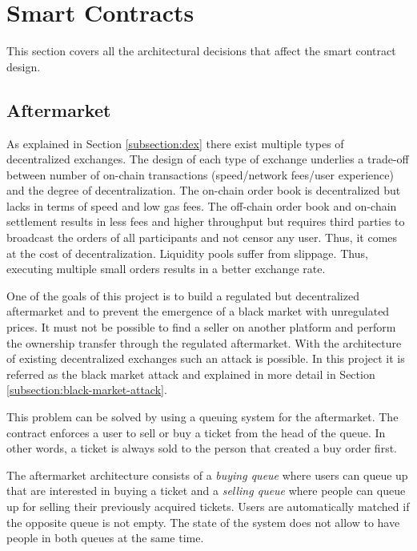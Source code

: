 
\section{Smart Contracts}

This section covers all the architectural decisions that affect the smart contract design. 

\subsection{Aftermarket}\label{section:aftermarket}
As explained in Section \ref{subsection:dex} there exist multiple types of decentralized exchanges. The design of each type of exchange underlies a trade-off between number of on-chain transactions (speed/network fees/user experience) and the degree of decentralization. The on-chain order book is decentralized but lacks in terms of speed and low gas fees. The off-chain order book and on-chain settlement results in less fees and higher throughput but requires third parties to broadcast the orders of all participants and not censor any user. Thus, it comes at the cost of decentralization. Liquidity pools suffer from slippage. Thus, executing multiple small orders results in a better exchange rate.

One of the goals of this project is to build a regulated but decentralized aftermarket and to prevent the emergence of a black market with unregulated prices. It must not be possible to find a seller on another platform and perform the ownership transfer through the regulated aftermarket. With the architecture of existing decentralized exchanges such an attack is possible. In this project it is referred as the black market attack and explained in more detail in Section \ref{subsection:black-market-attack}. 

This problem can be solved by using a queuing system for the aftermarket. The contract enforces a user to sell or buy a ticket from the head of the queue. In other words, a ticket is always sold to the person that created a buy order first. 

The aftermarket architecture consists of a \textit{buying queue} where users can queue up that are interested in buying a ticket and a \textit{selling queue} where people can queue up for selling their previously acquired tickets. Users are automatically matched if the opposite queue is not empty. The state of the system does not allow to have people in both queues at the same time. 

